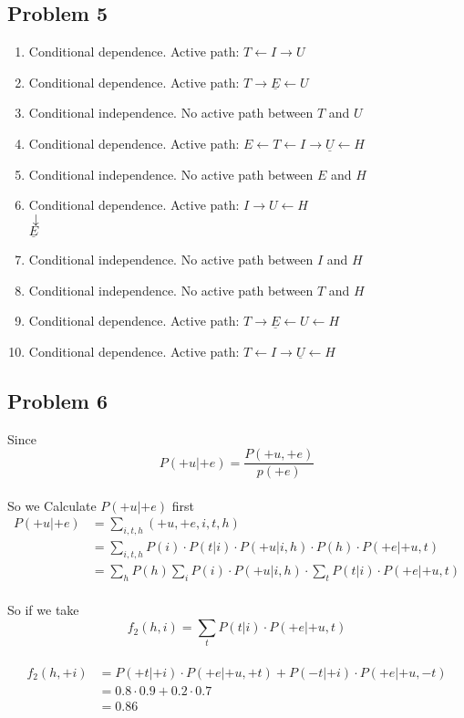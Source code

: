 \documentclass[]{article}
\begin{document}
 \subsection*{Problem 5}
\begin{enumerate}[1.]
\item  Conditional dependence. Active path: $T\leftarrow I \rightarrow U$
\item  Conditional dependence. Active path: $T\rightarrow \underline E \leftarrow U$
\item Conditional independence. No active path between $T$ and $U$
\item  Conditional dependence. Active path: $E\leftarrow T \leftarrow I \rightarrow \underline U \leftarrow H$
\item Conditional independence. No active path between $E$ and $H$
\item  Conditional dependence. Active path: $I\rightarrow U \leftarrow H$ \\\hspace*{190pt} $\downarrow$\\\hspace*{188pt} $ \underline E$
\item Conditional independence. No active path between $I$ and $H$
\item Conditional independence. No active path between $T$ and $H$
\item  Conditional dependence. Active path: $T\rightarrow \underline E \leftarrow U \leftarrow H$
\item  Conditional dependence. Active path: $T\leftarrow I \rightarrow \underline U \leftarrow H$
\end{enumerate}

\subsection*{Problem 6}
Since $$P(+u|+e) = \frac {P(+u, +e)}{p(+e)}$$ \\
So we Calculate $P(+u|+e)$ first\\

\begin{equation} 
\begin{split}
P(+u|+e) & = \sum_{i,t,h}(+u,+e,i,t,h) \\
 & = \sum_{i,t,h}P(i)\cdot P(t|i)\cdot P(+u|i,h)\cdot P(h)\cdot P(+e|+u,t) \\
 & = \sum_{h}P(h) \sum_{i}P(i) \cdot P(+u|i,h)\cdot \sum_{t}P(t|i)\cdot P(+e|+u,t)
\end{split}
\end{equation}
\\
So if we take $$f_2(h,i) = \sum_{t}P(t|i)\cdot P(+e|+u,t)$$ \\
\begin{equation} 
\begin{split}
f_2(h,+i) & = P(+t|+i)\cdot P(+e|+u,+t)+P(-t|+i)\cdot P(+e|+u,-t) \\
 & = 0.8\cdot 0.9+0.2\cdot 0.7 \\
 & = 0.86
\end{split}
\end{equation}
\end{document}
